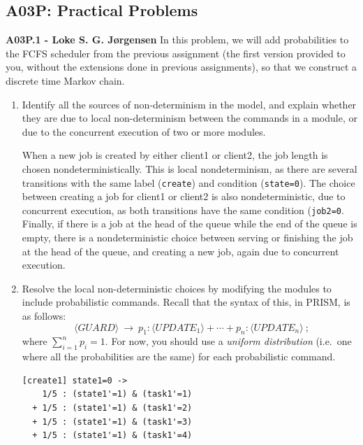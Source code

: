 \documentclass[12pt,a4paper]{article}
\newcommand{\Pend}{\ \mathtt{;}}
\newcommand{\Parrow}{\rightarrow}
\newcommand{\Paction}[1]{[#1]\ }
\begin{document}
\subsection*{A03P: Practical Problems}
\begin{description}
\item{\bf A03P.1 - Loke S. G. Jørgensen} In this problem, we will add probabilities to the FCFS scheduler from the previous assignment (the first version provided to you, without the extensions done in previous assignments), so that we construct a
discrete time Markov chain.
\begin{enumerate}[label=\alph*)]
\item Identify all the sources of non-determinism in the model, and explain whether they are due to local non-determinism
between the commands in a module, or due to the concurrent execution of two or more modules.
%
\ifwithanswers
\color{blue}
\par
When a new job is created by either client1 or client2, the job length is chosen nondeterministically. This is local nondeterminism, as there are several transitions with the same label (\texttt{create}) and condition (\texttt{state=0}). The choice between creating a job for client1 or client2 is also nondeterministic, due to concurrent execution, as both transitions have the same condition (\texttt{job2=0}. Finally, if there is a job at the head of the queue while the end of the queue is empty, there is a nondeterministic choice between serving or finishing the job at the head of the queue, and creating a new job, again due to concurrent execution.
\color{black}
\fi
%
\item Resolve the local non-deterministic choices by modifying the modules to include probabilistic commands. Recall that the
syntax of this, in PRISM, is as follows:
\begin{equation*}
\Paction{\langle \mathit{ACTION} \rangle}\ \langle \mathit{GUARD} \rangle\ \Parrow\ p_1 : \langle \mathit{UPDATE}_1 \rangle + \cdots
+ p_n : \langle \mathit{UPDATE}_n \rangle \Pend
\end{equation*}
where $\sum_{i=1}^n p_i = 1$. For now, you should use a \emph{uniform distribution} (i.e.\ one where all the probabilities are the same)
for each probabilistic command.
%
\ifwithanswers
\color{blue}
\par
\begin{lstlisting}
[create1] state1=0 ->
    1/5 : (state1'=1) & (task1'=1)
  + 1/5 : (state1'=1) & (task1'=2)
  + 1/5 : (state1'=1) & (task1'=3)
  + 1/5 : (state1'=1) & (task1'=4)

\end{lstlisting}
\end{enumerate}
\end{description}
\end{document}
